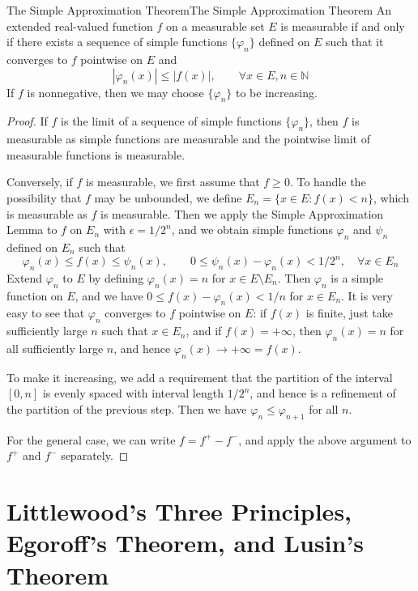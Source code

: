\documentclass[../main.tex]{subfiles}
\begin{document}
\begin{theorem}{The Simple Approximation Theorem}{The Simple Approximation Theorem}
	An extended real-valued function $f$ on a measurable set $E$ is measurable if and only if there exists a sequence of simple functions $\{\varphi_n\}$ defined on $E$ such that it converges to $f$ pointwise on $E$ and
	\begin{equation}
		|\varphi_n(x)| \leq |f(x)|, \qquad \forall x \in E, n \in \mathbb{N}
	\end{equation}
	If $f$ is nonnegative, then we may choose $\{\varphi_n\}$ to be increasing.
\end{theorem}
\begin{proof}
	If $f$ is the limit of a sequence of simple functions $\{\varphi_n\}$, then $f$ is measurable as simple functions are measurable and the pointwise limit of measurable functions is measurable.

	Conversely, if $f$ is measurable, we first assume that $f \geq 0$. To handle the possibility that $f$ may be unbounded, we define $E_n = \{x \in E : f(x) < n\}$, which is measurable as $f$ is measurable. Then we apply the Simple Approximation Lemma to $f$ on $E_n$ with $\epsilon = 1/2^n$, and we obtain simple functions $\varphi_n$ and $\psi_n$ defined on $E_n$ such that
	\begin{equation}
		\varphi_n(x) \leq f(x) \leq \psi_n(x), \qquad 0 \leq \psi_n(x) - \varphi_n(x) < 1/2^n, \quad \forall x \in E_n
	\end{equation}
	Extend $\varphi_n$ to $E$ by defining $\varphi_n(x) = n$ for $x \in E \setminus E_n$. Then $\varphi_n$ is a simple function on $E$, and we have $0 \leq f(x) - \varphi_n(x) < 1/n$ for $x \in E_n$. It is very easy to see that $\varphi_n$ converges to $f$ pointwise on $E$: if $f(x)$ is finite, just take sufficiently large $n$ such that $x \in E_n$, and if $f(x) = +\infty$, then $\varphi_n(x) = n$ for all sufficiently large $n$, and hence $\varphi_n(x) \to +\infty = f(x)$.

	To make it increasing, we add a requirement that the partition of the interval $[0, n]$ is evenly spaced with interval length $1/2^n$, and hence is a refinement of the partition of the previous step. Then we have $\varphi_n \leq \varphi_{n+1}$ for all $n$.

	For the general case, we can write $f = f^+ - f^-$, and apply the above argument to $f^+$ and $f^-$ separately.
\end{proof}

\section{Littlewood's Three Principles, Egoroff's Theorem, and Lusin's Theorem}
\end{document}
